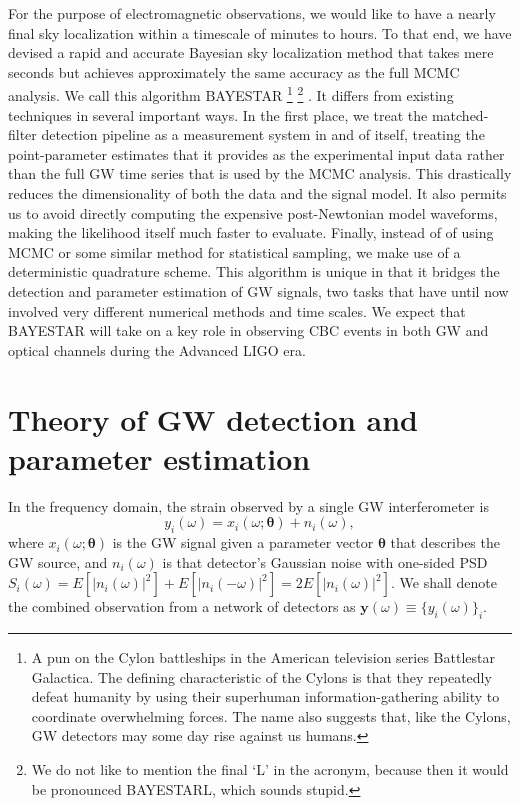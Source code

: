 \documentclass[amsmath,amssymb,aps,prx,reprint,nopreprintnumbers,nofootinbib]{revtex4-1}
\begin{document}
For the purpose of electromagnetic observations, we would like to have a nearly final sky localization within a timescale of minutes to hours. To that end, we have devised a rapid and accurate Bayesian sky localization method that takes mere seconds but achieves approximately the same accuracy as the full \ac{MCMC} analysis. We call this algorithm \ac{BAYESTAR}%
%
\footnote{A pun on the Cylon battleships in the American television series Battlestar Galactica. The defining characteristic of the Cylons is that they repeatedly defeat humanity by using their superhuman information\nobreakdashes-gathering ability to coordinate overwhelming forces. The name also suggests that, like the Cylons, \ac{GW} detectors may some day rise against us humans.}%
%
\footnote{We do not like to mention the final `L' in the acronym, because then it would be pronounced BAYESTARL, which sounds stupid.}%
. It differs from existing techniques in several important ways. In the first place, we treat the matched-filter detection pipeline as a measurement system in and of itself, treating the point\nobreakdashes-parameter estimates that it provides as the experimental input data rather than the full \ac{GW} time series that is used by the \ac{MCMC} analysis. This drastically reduces the dimensionality of both the data and the signal model. It also permits us to avoid directly computing the expensive post-Newtonian model waveforms, making the likelihood itself much faster to evaluate. Finally, instead of of using \ac{MCMC} or some similar method for statistical sampling, we make use of a deterministic quadrature scheme. This algorithm is unique in that it bridges the detection and parameter estimation of \ac{GW} signals, two tasks that have until now involved very different numerical methods and time scales. We expect that \ac{BAYESTAR} will take on a key role in observing \ac{CBC} events in both \ac{GW} and optical channels during the Advanced LIGO era.

\section{Theory of \ac{GW} detection and parameter estimation}

In the frequency domain, the strain observed by a single \ac{GW} interferometer is
%
\begin{equation}\label{eq:signal-model}
    y_i (\omega) = x_i (\omega; \bm\theta) + n_i (\omega),
\end{equation}
%
where $x_i (\omega; \bm\theta)$ is the \ac{GW} signal given a parameter vector $\bm\theta$ that describes the \ac{GW} source, and $n_i (\omega)$ is that detector's Gaussian noise with one\nobreakdashes-sided \ac{PSD} $S_i(\omega) = E\left[\left|n_i(\omega)\right|^2\right] + E\left[\left|n_i(-\omega)\right|^2\right] = 2 E\left[\left|n_i(\omega)\right|^2\right]$. We shall denote the combined observation from a network of detectors as $\mathbf y (\omega) \equiv \{y_i (\omega)\}_i$.
\end{document}
